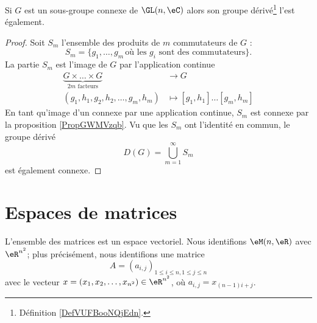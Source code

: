 \begin{lemma}
    Si \( G\) est un sous-groupe connexe de \( \GL(n,\eC)\) alors son groupe dérivé\footnote{Définition \ref{DefVUFBooNQjEdn}.} l'est également.
\end{lemma}

\begin{proof}
    Soit \( S_m\) l'ensemble des produits de \( m\) commutateurs de \( G\) :
    \begin{equation}
        S_m=\{ g_1,\ldots, g_m\,\text{où les } g_i\text{ sont des commutateurs} \}.
    \end{equation}
    La partie \( S_m\) est l'image de \( G\) par l'application continue
    \begin{equation}
        \begin{aligned}
            \underbrace{G\times \ldots\times G}_{ 2m\text{ facteurs}}&\to G \\
            (g_1,h_1,g_2,h_2,\ldots, g_m,h_m)&\mapsto [g_1,h_1]\ldots [g_m,h_m] 
        \end{aligned}
    \end{equation}
    En tant qu'image d'un connexe par une application continue, \( S_m\) est connexe par la proposition \ref{PropGWMVzqb}. Vu que les \( S_m\) ont l'identité en commun, le groupe dérivé
    \begin{equation}
        D(G)=\bigcup_{m=1}^{\infty}S_m
    \end{equation}
    est également connexe.
\end{proof}

\section{Espaces de matrices}

L'ensemble des matrices est un espace vectoriel. Nous identifions $\eM(n,\eR)$ avec $ \eR^{n^2}$; plus précisément, nous identifions une matrice 
\begin{equation}
    A = (a_{i,j})_{1\leq i \leq n, 1 \leq j \leq n}
\end{equation}
avec le vecteur $x = (x_1, x_2, \dots, x_{n^2}) \in \eR^{n^2}$, où $ a_{i,j} = x_{(n-1)i + j}$. 

